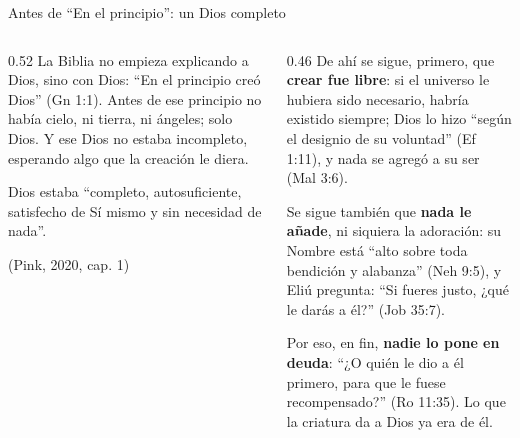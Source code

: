\begin{frame}{Antes de ``En el principio'': un Dios completo}
\begin{columns}[t,onlytextwidth]
\begin{column}{0.52\textwidth}\small
La Biblia no empieza explicando a Dios, sino con Dios: ``En el principio creó Dios'' (Gn 1:1). Antes de ese principio no había cielo, ni tierra, ni ángeles; solo Dios. Y ese Dios no estaba incompleto, esperando algo que la creación le diera.\par\medskip
\begin{tcolorbox}[colback=papiro,colframe=dorado,boxrule=1pt,arc=3pt]
\centering\small Dios estaba ``completo, autosuficiente, satisfecho de Sí mismo y sin necesidad de nada''.\par
{\scriptsize\color{gris}(Pink, 2020, cap. 1)}
\end{tcolorbox}
\end{column}
\begin{column}{0.46\textwidth}\scriptsize
De ahí se sigue, primero, que \textbf{crear fue libre}: si el universo le hubiera sido necesario, habría existido siempre; Dios lo hizo ``según el designio de su voluntad'' (Ef 1:11), y nada se agregó a su ser (Mal 3:6).\par\smallskip
Se sigue también que \textbf{nada le añade}, ni siquiera la adoración: su Nombre está ``alto sobre toda bendición y alabanza'' (Neh 9:5), y Eliú pregunta: ``Si fueres justo, ¿qué le darás a él?'' (Job 35:7).\par\smallskip
Por eso, en fin, \textbf{nadie lo pone en deuda}: ``¿O quién le dio a él primero, para que le fuese recompensado?'' (Ro 11:35). Lo que la criatura da a Dios ya era de él.
\end{column}
\end{columns}
\end{frame}

